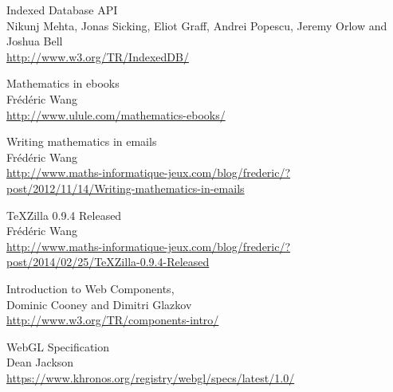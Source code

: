 \begin{thebibliography}{7}
Indexed Database API \\
Nikunj Mehta, Jonas Sicking, Eliot Graff, Andrei Popescu, Jeremy Orlow and
Joshua Bell \\
\href{http://www.w3.org/TR/IndexedDB/}{http://www.w3.org/TR/IndexedDB/}

Mathematics in ebooks \\
Frédéric Wang \\
\href{http://www.ulule.com/mathematics-ebooks/}{http://www.ulule.com/mathematics-ebooks/}

Writing mathematics in emails \\
Frédéric Wang \\
\href{http://www.maths-informatique-jeux.com/blog/frederic/?post/2012/11/14/Writing-mathematics-in-emails}{http://www.maths-informatique-jeux.com/blog/frederic/?post/2012/11/14/Writing-mathematics-in-emails}

TeXZilla 0.9.4 Released \\
Frédéric Wang \\
\href{http://www.maths-informatique-jeux.com/blog/frederic/?post/2014/02/25/TeXZilla-0.9.4-Released}{http://www.maths-informatique-jeux.com/blog/frederic/?post/2014/02/25/TeXZilla-0.9.4-Released}

Introduction to Web Components, \\
Dominic Cooney and Dimitri Glazkov \\
\href{http://www.w3.org/TR/components-intro/}{http://www.w3.org/TR/components-intro/}

WebGL Specification \\
Dean Jackson \\
\href{https://www.khronos.org/registry/webgl/specs/latest/1.0/}{https://www.khronos.org/registry/webgl/specs/latest/1.0/}

\end{thebibliography}
